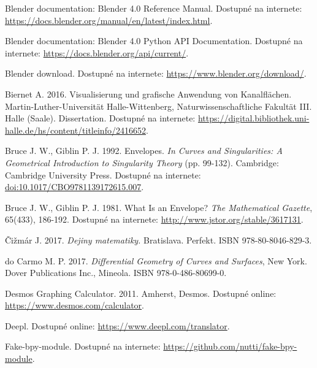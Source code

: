 \documentclass[12pt, twoside]{book}
\theoremstyle{definition}
\begin{document}
\begin{thebibliography}{99}


 Blender documentation: Blender 4.0 Reference Manual. Dostupné na internete: \url{https://docs.blender.org/manual/en/latest/index.html}.

 Blender documentation: Blender 4.0 Python API Documentation. Dostupné na internete: \url{https://docs.blender.org/api/current/}.

 Blender download. Dostupné na internete: \url{https://www.blender.org/download/}.

 Biernet A. 2016. Visualisierung und grafische Anwendung von Kanalflächen. Martin-Luther-Universität Halle-Wittenberg, Naturwissenschaftliche Fakultät III. Halle (Saale). Dissertation. Dostupné na internete: \url{https://digital.bibliothek.uni-halle.de/hs/content/titleinfo/2416652}.

 Bruce J. W., Giblin P. J. 1992. Envelopes. \textit{In Curves and Singularities: A Geometrical Introduction to Singularity Theory} (pp. 99-132). Cambridge: Cambridge University Press. Dostupné na internete: \url{doi:10.1017/CBO9781139172615.007}.

 Bruce J. W., Giblin P. J. 1981. What Is an Envelope? \textit{The Mathematical Gazette}, 65(433), 186-192. Dostupné na internete: \url{http://www.jstor.org/stable/3617131}.

 Čižmár J. 2017. \textit{Dejiny matematiky.} Bratislava. Perfekt. ISBN 978-80-8046-829-3.

 do Carmo M. P. 2017. \textit{Differential Geometry of Curves and Surfaces}, New York. Dover Publications Inc., Mineola. ISBN 978-0-486-80699-0.

 Desmos Graphing Calculator. 2011. Amherst, Desmos. Dostupné online: \url{https://www.desmos.com/calculator}. 

 Deepl. Dostupné online: \url{https://www.deepl.com/translator}.

 Fake-bpy-module. Dostupné na internete: \url{https://github.com/nutti/fake-bpy-module}.


\end{thebibliography}
\end{document}
